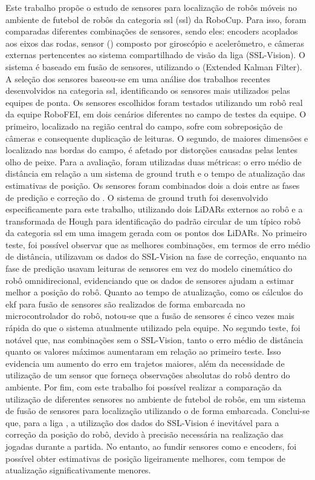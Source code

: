 \documentclass[acronym, symbols, table, deposito]{fei}
\begin{document}
\begin{resumo}
Este trabalho propõe o estudo de sensores para localização de robôs móveis no ambiente de futebol de robôs da categoria \acrlong{ssl} (\acrshort{ssl}) da RoboCup. Para isso, foram comparadas diferentes combinações de sensores, sendo eles: encoders acoplados aos eixos das rodas, sensor  () composto por giroscópio e acelerômetro, e câmeras externas pertencentes ao sistema compartilhado de visão da liga (SSL-Vision). O sistema é baseado em fusão de sensores, utilizando o  (Extended Kalman Filter). A seleção dos sensores baseou-se em uma análise dos trabalhos recentes desenvolvidos na categoria \acrshort{ssl}, identificando os sensores mais utilizados pelas equipes de ponta. Os sensores escolhidos foram testados utilizando um robô real da equipe RoboFEI, em dois cenários diferentes no campo de testes da equipe. O primeiro, localizado na região central do campo, sofre com sobreposição de câmeras e consequente duplicação de leituras. O segundo, de maiores dimensões e localizado nas bordas do campo, é afetado por distorções causadas pelas lentes olho de peixe. Para a avaliação, foram utilizadas duas métricas: o erro médio de distância em relação a um sistema de ground truth e o tempo de atualização das estimativas de posição. Os sensores foram combinados dois a dois entre as fases de predição e correção do . O sistema de ground truth foi desenvolvido especificamente para este trabalho, utilizando dois LiDARs externos ao robô e a transformada de Hough para identificação do padrão circular de um típico robô da categoria \acrshort{ssl} em uma imagem gerada com os pontos dos LiDARs. No primeiro teste, foi possível observar que as melhores combinações, em termos de erro médio de distância, utilizavam os dados do SSL-Vision na fase de correção, enquanto na fase de predição usavam leituras de sensores em vez do modelo cinemático do robô omnidirecional, evidenciando que os dados de sensores ajudam a estimar melhor a posição do robô. Quanto ao tempo de atualização, como os cálculos do \acrshort{ekf} para fusão de sensores são realizados de forma embarcada no microcontrolador do robô, notou-se que a fusão de sensores é cinco vezes mais rápida do que o sistema atualmente utilizado pela equipe. No segundo teste, foi notável que, nas combinações sem o SSL-Vision, tanto o erro médio de distância quanto os valores máximos aumentaram em relação ao primeiro teste. Isso evidencia um aumento do erro em trajetos maiores, além da necessidade de utilização de um sensor que forneça observações absolutas do robô dentro do ambiente. Por fim, com este trabalho foi possível realizar a comparação da utilização de diferentes sensores no ambiente de futebol de robôs, em um sistema de fusão de sensores para localização utilizando o  de forma embarcada. Conclui-se que, para a liga , a utilização dos dados do SSL-Vision é inevitável para a correção da posição do robô, devido à precisão necessária na realização das jogadas durante a partida. No entanto, ao fundir sensores como  e encoders, foi possível obter estimativas de posição ligeiramente melhores, com tempos de atualização significativamente menores.
	

\end{resumo}
\end{document}
